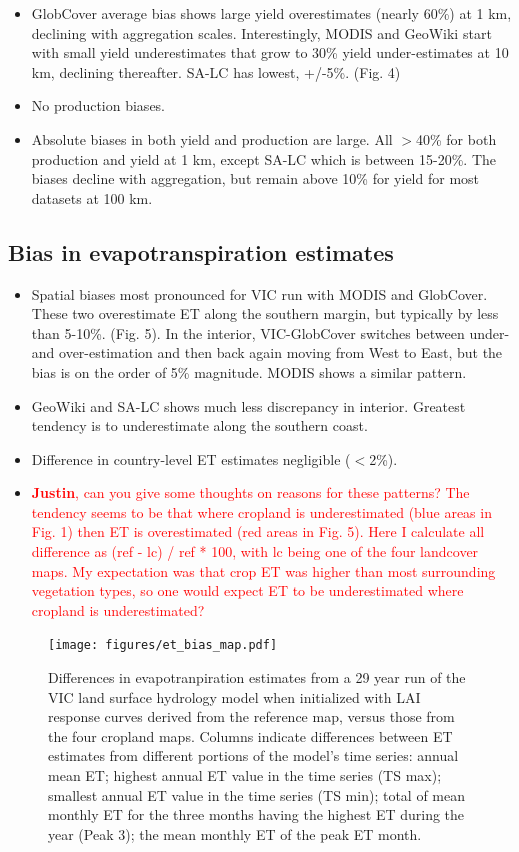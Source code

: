 \documentclass{pnastwo}
\begin{document}
\begin{article}
\begin{itemize}
 \item GlobCover average bias shows large yield overestimates (nearly 60\%) at 1 km, declining with aggregation scales. Interestingly, MODIS and GeoWiki start with small yield underestimates that grow to 30\% yield under-estimates at 10 km, declining thereafter. SA-LC has lowest, +/-5\%. (Fig. 4) 
 \item No production biases.
 \item Absolute biases in both yield and production are large. All $>$40\% for both production and yield at 1 km, except SA-LC which is between 15-20\%.  The biases decline with aggregation, but remain above 10\% for yield for most datasets at 100 km.  

\end{itemize}

\subsection{Bias in evapotranspiration estimates}
\begin{itemize}
 \item Spatial biases most pronounced for VIC run with MODIS and GlobCover. These two overestimate ET along the southern margin, but typically by less than 5-10\%. (Fig. 5).  In the interior, VIC-GlobCover switches between under-  and over-estimation and then back again moving from West to East, but the bias is on the order of 5\% magnitude.  MODIS shows a similar pattern.    
 \item GeoWiki and SA-LC shows much less discrepancy in interior. Greatest tendency is to underestimate along the southern coast. 
 \item Difference in country-level ET estimates negligible ($<$2\%).
 \item \textcolor{red}{\textbf{Justin}, can you give some thoughts on reasons for these patterns? The tendency seems to be that where cropland is underestimated (blue areas in Fig. 1) then ET is overestimated (red areas in Fig. 5). Here I calculate all difference as (ref - lc) / ref * 100, with lc being one of the four landcover maps. My expectation was that crop ET was higher than most surrounding vegetation types, so one would expect ET to be underestimated where cropland is underestimated?}
\end{itemize}

\vspace{-0.5 cm}
\begin{figure}[ht]
\centerline{\texttt{[image: figures/et\_bias\_map.pdf]}}
\caption{Differences in evapotranpiration estimates from a 29 year run of the VIC land surface hydrology model when initialized with LAI response curves derived from the reference map, versus those from the four cropland maps. Columns indicate differences between ET estimates from different portions of the model's time series: annual mean ET; highest annual ET value in the time series (TS max); smallest annual ET value in the time series (TS min); total of mean monthly ET for the three months having the highest ET during the year (Peak 3); the mean monthly ET of the peak ET month.}\label{afoto}
\end{figure}


\end{article}
\end{document}
